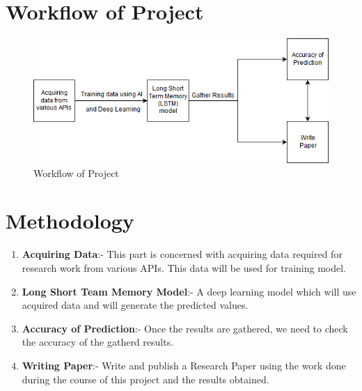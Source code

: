 \section{Workflow of Project}
\begin{figure}[ht]
    \centering \includegraphics[scale=0.7]{images/fc.png}
    \caption{Workflow of Project}
\end{figure}


\section{Methodology}
    \begin{enumerate}
        \item \textbf{Acquiring Data}:- This part is concerned with acquiring data required for research work from various APIs. This data will be used for training model.
        
        \item \textbf{Long Short Team Memory Model}:- A deep learning model which will use acquired data and will generate the predicted values.

        \item \textbf{Accuracy of Prediction}:- Once the results are gathered, we need to check the accuracy of the gatherd results.
        
        \item \textbf{Writing Paper}:- Write and publish a Research Paper using the work done during the course of this project and the results obtained.
    \end{enumerate} 

